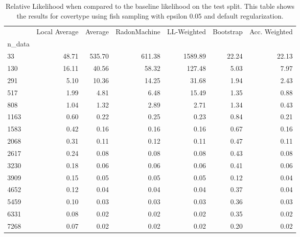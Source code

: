 \begin{table}
\centering
\caption{Relative Likelihood when compared to the baseline likelihood on the test split. This table shows the results for  covertype using  fish sampling with epsilon  0.05 and  default regularization.}
\label{tab:2}
\begin{tabular}{lrrrrrr}
\toprule
{} &  Local Average &  Average &  RadonMachine &  LL-Weighted &  Bootstrap &  Acc. Weighted \\
n\_data &                &          &               &              &            &                \\
\midrule
33     &          48.71 &   535.70 &        611.38 &      1589.89 &      22.24 &          22.13 \\
130    &          16.11 &    40.56 &         58.32 &       127.48 &       5.03 &           7.97 \\
291    &           5.10 &    10.36 &         14.25 &        31.68 &       1.94 &           2.43 \\
517    &           1.99 &     4.81 &          6.48 &        15.49 &       1.35 &           0.88 \\
808    &           1.04 &     1.32 &          2.89 &         2.71 &       1.34 &           0.43 \\
1163   &           0.60 &     0.22 &          0.25 &         0.23 &       0.84 &           0.21 \\
1583   &           0.42 &     0.16 &          0.16 &         0.16 &       0.67 &           0.16 \\
2068   &           0.31 &     0.11 &          0.12 &         0.11 &       0.47 &           0.11 \\
2617   &           0.24 &     0.08 &          0.08 &         0.08 &       0.43 &           0.08 \\
3230   &           0.18 &     0.06 &          0.06 &         0.06 &       0.41 &           0.06 \\
3909   &           0.15 &     0.05 &          0.05 &         0.05 &       0.12 &           0.04 \\
4652   &           0.12 &     0.04 &          0.04 &         0.04 &       0.37 &           0.04 \\
5459   &           0.10 &     0.03 &          0.03 &         0.03 &       0.36 &           0.03 \\
6331   &           0.08 &     0.02 &          0.02 &         0.02 &       0.35 &           0.02 \\
7268   &           0.07 &     0.02 &          0.02 &         0.02 &       0.20 &           0.02 \\
\bottomrule
\end{tabular}
\end{table}
